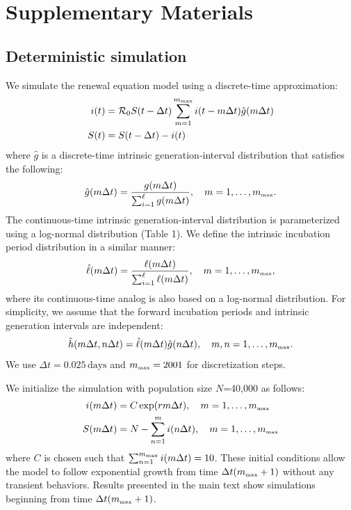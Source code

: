 \documentclass[12pt]{article}
\newcommand{\Rx}[1]{\ensuremath{{\mathcal R}_{#1}}\xspace}
\newcommand{\Ro}{\Rx{0}}
\newcommand{\tsub}[2]{#1_{{\textrm{\tiny #2}}}}
\newcommand{\gdist}{g} %
\newcommand{\idist}{\ell} %
\begin{document}
\pagebreak

\section{Supplementary Materials}

\subsection{Deterministic simulation}

We simulate the renewal equation model using a discrete-time approximation:
\begin{align}
i(t) &= \Ro S(t-\Delta t) \sum_{m=1}^{\tsub{m}{max}} i(t-m \Delta t) \hat{\gdist}(m \Delta t) \nonumber \\
S(t) &= S(t-\Delta t) - i(t)
\end{align}
where $\hat{\gdist}$ is a discrete-time intrinsic generation-interval distribution that satisfies the following:
\begin{equation}
\hat{\gdist}(m \Delta t) = \frac{\gdist(m \Delta t)}{\sum_{i=1}^\ell \gdist(m \Delta t)}, \quad m=1, \dots, \tsub{m}{max}.
\end{equation}
The continuous-time intrinsic generation-interval distribution is parameterized using a log-normal distribution (Table 1). We define the intrinsic incubation period distribution in a similar manner:
\begin{equation}
\hat{\idist}(m \Delta t) = \frac{\idist(m \Delta t)}{\sum_{i=1}^\ell \idist(m \Delta t)}, \quad m=1, \dots, \tsub{m}{max},
\end{equation}
where its continuous-time analog is also based on a log-normal distribution.
For simplicity, we assume that the forward incubation periods and intrinsic generation intervals are independent:
\begin{equation}
\hat{h}(m \Delta t, n \Delta t) = \hat{\idist}(m \Delta t)\hat{\gdist}(n \Delta t), \quad m,n=1, \dots, \tsub{m}{max}.
\end{equation}
We use $\Delta t = 0.025\,\textrm{days}$ and $\tsub{m}{max}=2001$ for discretization steps.

We initialize the simulation with population size $N$=40,000 as follows:
\begin{align}
i(m \Delta t) &= C \exp(r m \Delta t), \quad m=1, \dots, \tsub{m}{max}\nonumber \\
S(m \Delta t) &= N - \sum_{n=1}^m i(n \Delta t), \quad m=1, \dots, \tsub{m}{max}
\end{align}
where $C$ is chosen such that $\sum_{n=1}^{\tsub{m}{max}} i(m \Delta t)=10$.
These initial conditions allow the model to follow exponential growth from time $\Delta t (\tsub{m}{max} + 1)$ without any transient behaviors.
Results presented in the main text show simulations beginning from time $\Delta t (\tsub{m}{max} + 1)$.
\end{document}
